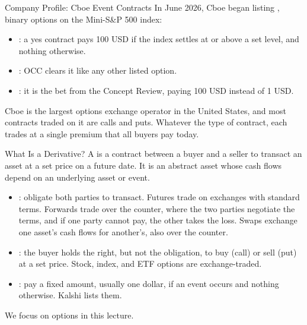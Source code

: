 \documentclass[aspectratio=169,11pt]{beamer}
\begin{document}
\begin{frame}{Company Profile: Cboe Event Contracts}
  In June 2026, Cboe began listing , binary options on
  the Mini-S\&P 500 index:
  \begin{itemize}\setlength{\itemsep}{0.5em}
    \item {}: a yes contract pays 100 USD if the index settles at or
      above a set level, and nothing otherwise.
    \item {}: OCC clears it like any other listed option.
    \item {}: it is the bet from the Concept Review,
      paying 100 USD instead of 1 USD.
  \end{itemize}
  \vspace{0.4em}
  Cboe is the largest options exchange operator in the United States, and most
  contracts traded on it are calls and puts. Whatever the type of contract, each
  trades at a single premium that all buyers pay today.
  \textbf{}
\end{frame}

\begin{frame}{What Is a Derivative?}
  A  is a contract between a buyer and a seller to transact an
  asset at a set price on a future date. It is an abstract asset whose cash
  flows depend on an underlying asset or event.
  \begin{itemize}\setlength{\itemsep}{0.4em}
    \item {}: obligate both parties to
      transact. Futures trade on exchanges with standard terms. Forwards trade
      over the counter, where the two parties negotiate the terms, and if one
      party cannot pay, the other takes the loss. Swaps exchange one asset's cash
      flows for another's, also over the counter.
    \item {}: the buyer holds the right, but not the obligation, to
      buy (call) or sell (put) at a set price. Stock, index, and ETF options are
      exchange-traded.
    \item {}: pay a fixed amount, usually one dollar, if an
      event occurs and nothing otherwise. Kalshi lists them.
  \end{itemize}
  We focus on options in this lecture.
\end{frame}
\end{document}
